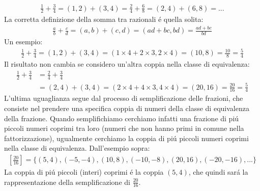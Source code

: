 \documentclass[twoside]{article} %
\begin{document}
		\begin{gather*}
			\frac{1}{2}+\frac{3}{4}=(1,2)+(3,4)=\frac{2}{4}+\frac{6}{8}=(2,4)+(6,8)=...
		\end{gather*}
		La corretta definizione della somma tra razionali \'e quella solita:
		\begin{gather*}
			\frac{a}{b}+\frac{c}{d}= (a,b)+(c,d)=(ad+bc,bd)= \frac{ad+bc}{bd}
		\end{gather*}	
		Un esempio:
		\begin{gather*}
			\frac{1}{2}+\frac{3}{4}= (1,2)+(3,4)=(1\times 4+2\times 3,2\times 4)=(10,8)= \frac{10}{8}=\frac{5}{4}
		\end{gather*}	
		Il risultato non cambia se considero un'altra coppia nella classe di equivalenza:
		{\small 
		\begin{align*}
			\frac{1}{2}+\frac{3}{4}&=\frac{2}{4}+\frac{3}{4}\\
								   &= (2,4)+(3,4)=(2\times 4+4\times 3,4\times 4)=(20,16)= \frac{20}{16}=\frac{5}{4}
		\end{align*} }
		L'ultima uguaglianza segue dal processo di semplificazione delle frazioni, che consiste nel prendere una specifica coppia di numeri della classe di equivalenza della frazione. Quando semplifichiamo cerchiamo infatti una frazione di pi\'u piccoli numeri coprimi tra loro (numeri che non hanno primi in comune nella fattorizzazione), ugualmente cerchiamo la coppia di pi\'u piccoli numeri coprimi nella classe di equivalenza. Dall'esempio sopra:
		\begin{gather*}
			\left[\frac{20}{16}\right]=\{(5,4),(-5,-4),(10,8),(-10,-8),(20,16),(-20,-16),...\}
		\end{gather*}
		La coppia di pi\'u piccoli (interi) coprimi \'e la coppia $(5,4)$, che quindi sar\'a la rappresentazione della semplificazione di $\frac{20}{16}$.
		\newpage	
\end{document}
